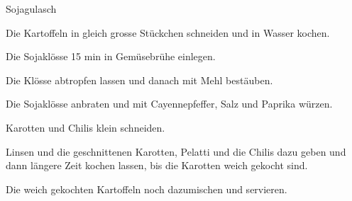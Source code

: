 
\begin{recipe}[]{Sojagulasch}{}{}



\step
Die Kartoffeln in gleich grosse St\"uckchen schneiden und in Wasser kochen.

\step
Die Sojakl\"osse 15 min in Gem\"usebr\"uhe einlegen.

\step
Die Kl\"osse abtropfen lassen und danach mit Mehl best\"auben.

\step
Die Sojakl\"osse anbraten und mit Cayennepfeffer, Salz und Paprika w\"urzen.

\step
Karotten und Chilis klein schneiden.

\step
Linsen und die geschnittenen Karotten, Pelatti und die Chilis dazu geben und dann l\"angere Zeit kochen lassen, bis die Karotten weich gekocht sind.

\step
Die weich gekochten Kartoffeln noch dazumischen und servieren.

\end{recipe}